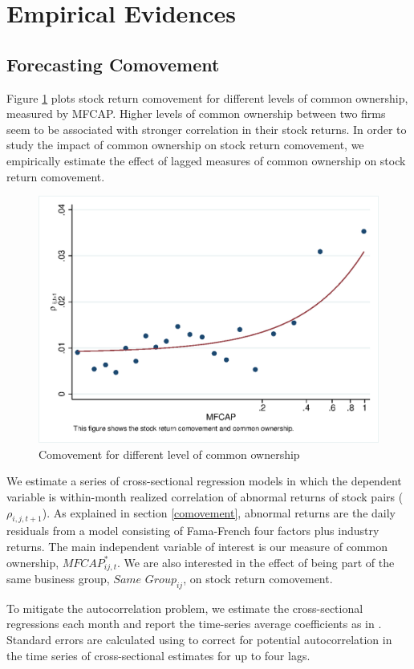 
\section{Empirical Evidences}



\subsection{{Forecasting Comovement}}
\label{Forecasting Comovement}

	Figure \ref{mcorr50} plots stock return comovement for different levels of common ownership, measured by MFCAP.  Higher levels of common	ownership between two firms seem to be associated with stronger correlation in their stock returns. In order to study the impact of common ownership on stock return comovement, we empirically estimate the effect of lagged measures of common ownership on stock return comovement. 
	\begin{figure}[htbp]
	\centering  
	\centering
	\includegraphics[width=0.7\linewidth]{"Output/mcorr50.eps"} 
	\caption{Comovement for different level of common ownership }
	\label{mcorr50}
\end{figure}
	
	We estimate a series of cross-sectional regression models in which the dependent variable is within-month realized correlation of abnormal returns of stock pairs ($\rho_{i,j,t+1}$). As explained in section \ref{comovement}, abnormal returns are the daily residuals from a model consisting of Fama-French four factors plus industry returns. The main independent variable of interest is our measure of common ownership, $\textit{MFCAP}^*_{ij,t}$. We are also interested in the effect of being part of the same business group,  $\textit{Same Group}_{ij} $, on stock return comovement.
		

	
	To mitigate the autocorrelation problem, we estimate the cross-sectional regressions each month and report the time-series average coefficients as in \cite{FamaMacBeth}. Standard errors are calculated using  \cite{newey1987hypothesis} to correct for potential autocorrelation in the time series of cross-sectional estimates for up to four lags. %
	

